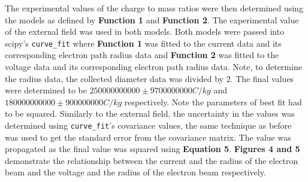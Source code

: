 \documentclass[
	letterpaper, %
	10pt, %
]{CSUniSchoolLabReport}
\begin{document}
The experimental values of the charge to mass ratios were then determined using the models as defined by \textbf{Function 1} and \textbf{Function 2}.
The experimental value of the external field was used in both models. Both models were passed into scipy's \lstinline{curve_fit} where \textbf{Function 1} was
fitted to the current data and its corresponding electron path radius data and \textbf{Function 2} was fitted to the voltage data and its corresponding electron
path radius data. Note, to determine the radius data, the collected diameter data was divided by 2. The final values were determined to be $250000000000 \pm 9700000000 C/kg$
and $180000000000 \pm 900000000 C/kg$ respectively. Note the parameters of best fit had to be squared. Similarly to the external field, the uncertainty
in the values was determined using \lstinline{curve_fit}'s covariance values, the same technique as before was used to get the standard error from the
covariance matrix. The value was propagated as the final value was squared using \textbf{Equation 5}. \textbf{Figures 4 and 5} demonstrate the relationship between the
current and the radius of the electron beam and the voltage and the radius of the electron beam respectively.\\
\end{document}
